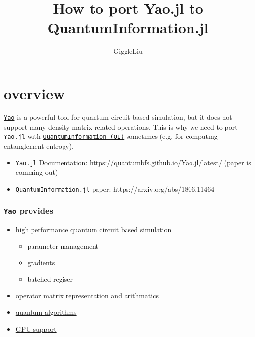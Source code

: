 \documentclass[11pt,a4paper]{article}
\title{ How to port Yao.jl to QuantumInformation.jl }
\author{ GiggleLiu }
\begin{document}
\maketitle

\section{overview}
\href{https://github.com/QuantumBFS/Yao.jl}{\texttt{Yao}} is a powerful tool for quantum circuit based simulation, but it does not support many density matrix related operations. This is why we need to port \texttt{Yao.jl} with \href{https://github.com/QuantumBFS/QuantumInformation.jl}{\texttt{QuantumInformation (QI)}} sometimes (e.g. for computing entanglement entropy).

\begin{itemize}
\item \texttt{Yao.jl} Documentation: https://quantumbfs.github.io/Yao.jl/latest/ (paper is comming out)


\item \texttt{QuantumInformation.jl} paper: https://arxiv.org/abs/1806.11464

\end{itemize}
\subsubsection{\texttt{Yao} provides}
\begin{itemize}
\item high performance quantum circuit based simulation

\begin{itemize}
\item parameter management


\item gradients


\item batched regiser

\end{itemize}

\item operator matrix representation and arithmatics


\item \href{https://github.com/QuantumBFS/QuAlgorithmZoo.jl}{quantum algorithms}


\item \href{https://github.com/QuantumBFS/CuYao.jl}{GPU support}

\end{itemize}
\end{document}
